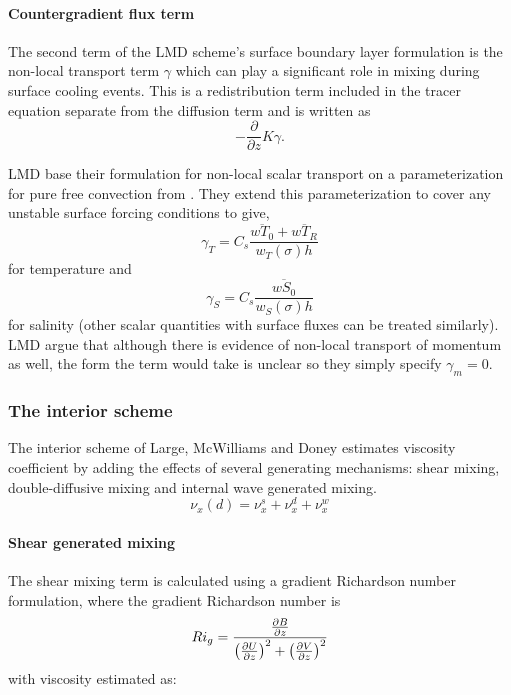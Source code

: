 \paragraph{Countergradient flux term}
The second term of the LMD scheme's surface boundary layer
formulation is the non-local transport term $\gamma$ which can play a
significant role in mixing during surface cooling events.  This is a
redistribution term included in the tracer equation separate from the
diffusion term and is written as 
\begin{equation}
-\frac{\partial}{\partial z}K\gamma.
\end{equation}

LMD base their formulation for non-local scalar transport on a
parameterization for pure free convection from
\citet{Mailhot82}. They extend this parameterization to cover any
unstable surface forcing conditions to give,
\begin{equation}
  \gamma_{T}=C_s\frac{\overline{wT_0}+
  \overline{wT_R}}{w_T(\sigma)h}
\end{equation}
for temperature and 
\begin{equation}
\gamma_S=C_s \frac{\overline{wS_0}}{w_S(\sigma)h}
\end{equation}
for salinity (other scalar quantities with surface fluxes can be
treated similarly). LMD argue that although there is evidence of
non-local transport of momentum as well, the form the term would take
is unclear so they simply specify $\gamma_m=0$.

\subsubsection{The interior scheme}
The interior scheme of Large, McWilliams and Doney estimates viscosity
coefficient by adding the effects of several generating mechanisms:
shear mixing, double-diffusive mixing and internal wave generated
mixing.
\begin{equation}
\nu_{x}(d)=\nu_{x}^s+\nu_{x}^d+\nu_{x}^w
\end{equation}

\paragraph{Shear generated mixing}
The shear mixing term is calculated using a
gradient Richardson number formulation, where the gradient Richardson
number is
\begin{equation}
  Ri_g = { {\partial B \over \partial z} \over
  \left({\partial U \over \partial z}\right)^2 +
  \left({\partial V \over \partial z}\right)^2 }
\end{equation}
with viscosity
estimated as: 

